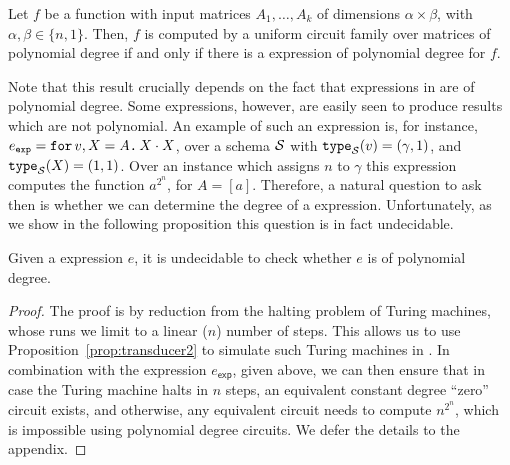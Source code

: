 \begin{theorem}
\label{th-equivalence}
Let $f$ be a function with input matrices $A_1,\ldots ,A_k$ of dimensions $\alpha\times \beta$, with $\alpha,\beta \in \{n,1\}$. Then, $f$ is computed by a uniform circuit family over matrices of polynomial degree if and only if there is a \langfor expression of polynomial degree for $f$. 
\end{theorem}

Note that this result crucially depends on the fact that expressions in \langfor are of polynomial degree.
Some \langfor expressions, however, are easily seen to produce results which are not polynomial.
An example of such an expression is, for instance, $e_{\texttt{exp}} = \texttt{for}\, v,X=A \texttt{.}\, X\cdot X$, over a schema $\mathcal{S}$ with $\texttt{type}_{\mathcal{S}}(v)= (\gamma,1)$, and $\texttt{type}_{\mathcal{S}}(X)=(1,1)$.
Over an instance which assigns $n$ to $\gamma$ this expression computes the function $a^{2^n}$, for $A=[a]$.
Therefore, a natural question to ask then is whether we can determine the degree of a \langfor expression.
Unfortunately, as we show in the following proposition this question is in fact undecidable.


\begin{proposition}
\label{prop-undec}
Given a \langfor expression $e$, %
 it is undecidable to check whether $e$ is of polynomial degree.
\end{proposition}

\begin{proof}
	The proof is by reduction from the halting problem of Turing machines, whose runs we limit to a linear ($n$) number of steps.
This allows us to use Proposition~\ref{prop:transducer2} to simulate such Turing machines in \langfor. In combination 
with the expression $e_{\mathsf{exp}}$, given above, we can then ensure that in case the Turing machine halts in $n$ steps, an equivalent constant degree
``zero'' circuit exists, and otherwise, any equivalent circuit needs to compute $n^{2^n}$, which is impossible using polynomial degree circuits.
We defer the details to the appendix.
\end{proof}


